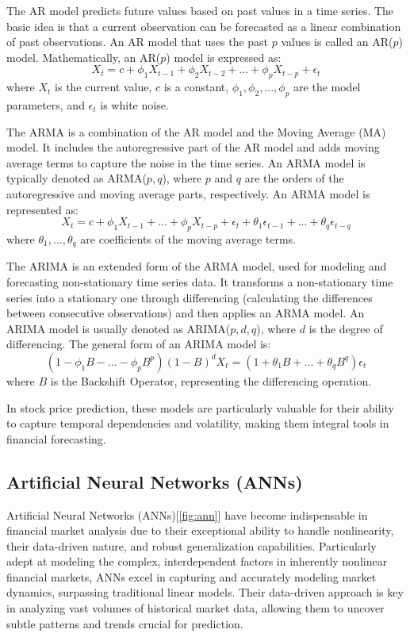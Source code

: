 \documentclass[10pt,twocolumn,letterpaper]{article}
\begin{document}
The AR model predicts future values based on past values in a time series. The basic idea is that a current observation can be forecasted as a linear combination of past observations. An AR model that uses the past \( p \) values is called an AR($p$) model. Mathematically, an AR($p$) model is expressed as:
\[
	X_t = c + \phi_1 X_{t-1} + \phi_2 X_{t-2} + ... + \phi_p X_{t-p} + \epsilon_t
\]
where \( X_t \) is the current value, \( c \) is a constant, \( \phi_1, \phi_2, ..., \phi_p \) are the model parameters, and \( \epsilon_t \) is white noise.

The ARMA is a combination of the AR model and the Moving Average (MA) model. It includes the autoregressive part of the AR model and adds moving average terms to capture the noise in the time series. An ARMA model is typically denoted as ARMA($p, q$), where \( p \) and \( q \) are the orders of the autoregressive and moving average parts, respectively. An ARMA model is represented as:
\[
	X_t = c + \phi_1 X_{t-1} + ... + \phi_p X_{t-p} + \epsilon_t + \theta_1 \epsilon_{t-1} + ... + \theta_q \epsilon_{t-q}
\]
where \( \theta_1, ..., \theta_q \) are coefficients of the moving average terms.

The ARIMA is an extended form of the ARMA model, used for modeling and forecasting non-stationary time series data. It transforms a non-stationary time series into a stationary one through differencing (calculating the differences between consecutive observations) and then applies an ARMA model. An ARIMA model is usually denoted as ARIMA($p, d, q$), where \( d \) is the degree of differencing. The general form of an ARIMA model is:
\[
	(1 - \phi_1 B - ... - \phi_p B^p)(1 - B)^d X_t = (1 + \theta_1 B + ... + \theta_q B^q) \epsilon_t
\]
where \( B \) is the Backshift Operator, representing the differencing operation.

In stock price prediction, these models are particularly valuable for their ability to capture temporal dependencies and volatility, making them integral tools in financial forecasting.
\subsection{Artificial Neural Networks (ANNs)}
Artificial Neural Networks (ANNs)\cite{shah2019stock,agrawal2013state}[\ref{fig:ann}] have become indispensable in financial market analysis due to their exceptional ability to handle nonlinearity, their data-driven nature, and robust generalization capabilities.
Particularly adept at modeling the complex, interdependent factors in inherently nonlinear financial markets, ANNs excel in capturing and accurately modeling market dynamics, surpassing traditional linear models.
Their data-driven approach is key in analyzing vast volumes of historical market data, allowing them to uncover subtle patterns and trends crucial for prediction.
\end{document}
